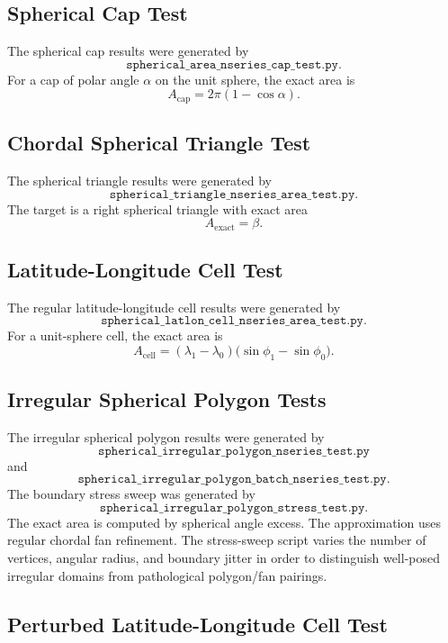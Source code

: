 \documentclass[11pt]{article}
\begin{document}
\subsection{Spherical Cap Test}

The spherical cap results were generated by
\[
  \texttt{spherical\_area\_nseries\_cap\_test.py}.
\]
For a cap of polar angle $\alpha$ on the unit sphere, the exact area is
\[
  A_{\mathrm{cap}}
  =
  2\pi(1-\cos\alpha).
\]

\subsection{Chordal Spherical Triangle Test}

The spherical triangle results were generated by
\[
  \texttt{spherical\_triangle\_nseries\_area\_test.py}.
\]
The target is a right spherical triangle with exact area
\[
  A_{\mathrm{exact}}=\beta.
\]

\subsection{Latitude-Longitude Cell Test}

The regular latitude-longitude cell results were generated by
\[
  \texttt{spherical\_latlon\_cell\_nseries\_area\_test.py}.
\]
For a unit-sphere cell, the exact area is
\[
  A_{\mathrm{cell}}
  =
  (\lambda_1-\lambda_0)
  \bigl(\sin\phi_1-\sin\phi_0\bigr).
\]

\subsection{Irregular Spherical Polygon Tests}

The irregular spherical polygon results were generated by
\[
  \texttt{spherical\_irregular\_polygon\_nseries\_test.py}
\]
and
\[
  \texttt{spherical\_irregular\_polygon\_batch\_nseries\_test.py}.
\]
The boundary stress sweep was generated by
\[
  \texttt{spherical\_irregular\_polygon\_stress\_test.py}.
\]
The exact area is computed by spherical angle excess.  The approximation uses regular chordal fan refinement.  The stress-sweep script varies the number of vertices, angular radius, and boundary jitter in order to distinguish well-posed irregular domains from pathological polygon/fan pairings.

\subsection{Perturbed Latitude-Longitude Cell Test}
\end{document}
